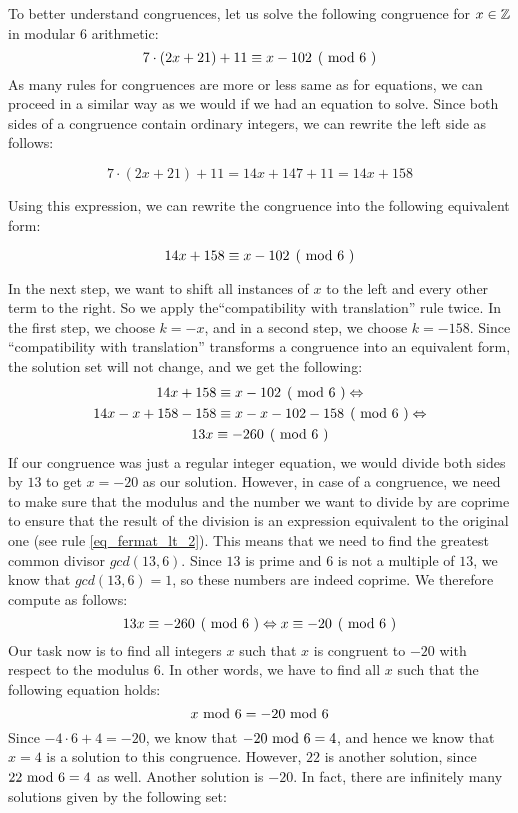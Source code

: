 \begin{example}
\label{example_first_congruence}
To better understand congruences, let us solve the following congruence for $x\in \mathbb{Z}$ in modular $6$ arithmetic:
$$\kongru{7\cdot(2x+21) + 11}{x-102}{6}$$
As many rules for congruences are more or less same as for equations, we can proceed in a  similar way as we would if we had an equation to solve. Since both sides of a congruence contain ordinary integers, we can rewrite the left side as follows: 

$$7\cdot(2x+21) + 11 = 14x + 147 + 11 = 14x +158$$

Using this expression, we can rewrite the congruence into the following equivalent form:

$$\kongru{14x +158}{x-102}{6}$$

In the next step, we want to shift all instances of $x$ to the left and every other term to the right. So we apply the``compatibility with translation'' rule twice. In the first step, we choose $k=-x$, and in a second step, we choose $k=-158$.  Since ``compatibility with translation'' transforms a congruence into an equivalent form, the solution set will not change, and we get the following:
\begin{multline*}
\kongru{14x +158}{x-102}{6} \Leftrightarrow\\
\kongru{14x-x +158-158}{x-x-102-158}{6} \Leftrightarrow \\
\kongru{13x}{-260}{6}
\end{multline*}
If our congruence was just a regular integer equation, we would divide both sides by $13$ to get $x=-20$ as our solution. However, in case of a congruence, we need to make sure that the modulus and the number we want to divide by are coprime to ensure that the result of the division is an expression equivalent to the original one (see rule \ref{eq_fermat_lt_2}). This means that we need to find the greatest common divisor $gcd(13,6)$. Since $13$ is prime and $6$ is not a multiple of $13$, we know that $gcd(13,6)=1$, so these numbers are indeed coprime. We therefore compute as follows:
$$
\kongru{13x}{-260}{6} \Leftrightarrow \kongru{x}{-20}{6}
$$
Our task now is  to find all integers $x$ such that $x$ is congruent to $-20$ with respect to the modulus $6$. In other words, we have to find all $x$ such that the following equation holds:
$$
x \text{ mod } 6 = -20 \text{ mod } 6
$$
Since $-4\cdot 6 +4 = -20$, we know that $ -20 \text{ mod } 6 = 4$, and hence we know that $x=4$ is a solution to this congruence. However, $22$ is another solution, since $ 22 \text{ mod } 6 = 4$ as well. Another solution is $-20$. In fact, there are infinitely many solutions given by the following set:

\end{example}
